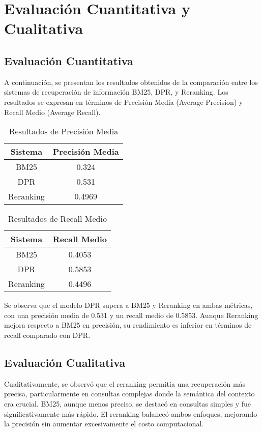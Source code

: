 \documentclass[runningheads]{llncs}
\begin{document}
\section{Evaluación Cuantitativa y Cualitativa}
\subsection{Evaluación Cuantitativa}

A continuación, se presentan los resultados obtenidos de la comparación entre los sistemas de recuperación de información BM25, DPR, y Reranking. Los resultados se expresan en términos de Precisión Media (Average Precision) y Recall Medio (Average Recall).

\begin{table}[H]
\centering
\caption{Resultados de Precisión Media}
\begin{tabular}{|c|c|}
\hline
\textbf{Sistema}   & \textbf{Precisión Media} \\ \hline
BM25               & 0.324                     \\ \hline
DPR                & 0.531                     \\ \hline
Reranking          & 0.4969                    \\ \hline
\end{tabular}
\end{table}

\begin{table}[H]
\centering
\caption{Resultados de Recall Medio}
\begin{tabular}{|c|c|}
\hline
\textbf{Sistema}   & \textbf{Recall Medio} \\ \hline
BM25               & 0.4053                    \\ \hline
DPR                & 0.5853                    \\ \hline
Reranking          & 0.4496                    \\ \hline
\end{tabular}
\end{table}

Se observa que el modelo DPR supera a BM25 y Reranking en ambas métricas, con una precisión media de 0.531 y un recall medio de 0.5853. Aunque Reranking mejora respecto a BM25 en precisión, su rendimiento es inferior en términos de recall comparado con DPR.

\subsection{Evaluación Cualitativa}
Cualitativamente, se observó que el reranking permitía una recuperación más precisa, particularmente en consultas complejas donde la semántica del contexto era crucial. BM25, aunque menos preciso, se destacó en consultas simples y fue significativamente más rápido. El reranking balanceó ambos enfoques, mejorando la precisión sin aumentar excesivamente el costo computacional.
\end{document}
